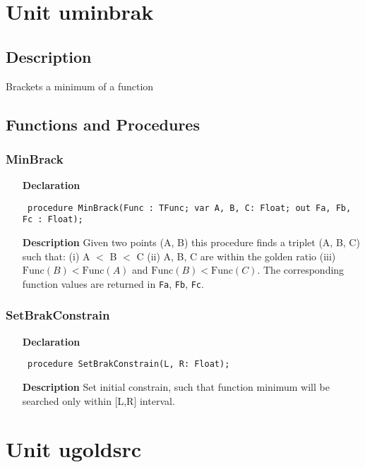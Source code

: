 \documentclass[12pt,a4paper,oneside]{report}
\newcommand{\declarationitem}[1]{\textbf{#1}}
\newcommand{\descriptiontitle}[1]{\textbf{#1}}
\newcommand{\code}[1]{\texttt{#1}}
\begin{document}
\section{Unit uminbrak}
\label{uminbrak}
\subsection{Description}
Brackets a minimum of a function 
\subsection{Functions and Procedures}
\subsubsection{MinBrack}
\label{uminbrak-MinBrack}
\begin{itemize}\item[\declarationitem{Declaration}\hfill]
	\begin{flushleft}
		\code{
			procedure MinBrack(Func : TFunc; var A, B, C: Float; out Fa, Fb, Fc : Float);}
	\end{flushleft}
	\item[\descriptiontitle{Description}]
	Given two points (A, B) this procedure finds a triplet (A, B, C) such that: (i) A {$<$} B {$<$} C (ii) A, B, C are within the golden ratio (iii) $\textrm{Func}(B) < \textrm{Func}(A)$ and $\textrm{Func}(B) < \textrm{Func}(C)$. The corresponding function values are returned in \code{Fa}, \code{Fb}, \code{Fc}.
\end{itemize}
\subsubsection{SetBrakConstrain}
\label{uminbrak-SetBrakConstrain}
\begin{itemize}\item[\declarationitem{Declaration}\hfill]
	\begin{flushleft}
		\code{
			procedure SetBrakConstrain(L, R: Float);}
	\end{flushleft}
	\item[\descriptiontitle{Description}]
	Set initial constrain, such that function minimum will be searched only within [L,R] interval. 	
\end{itemize}
\section{Unit ugoldsrc}
\label{ugoldsrc}
\end{document}
